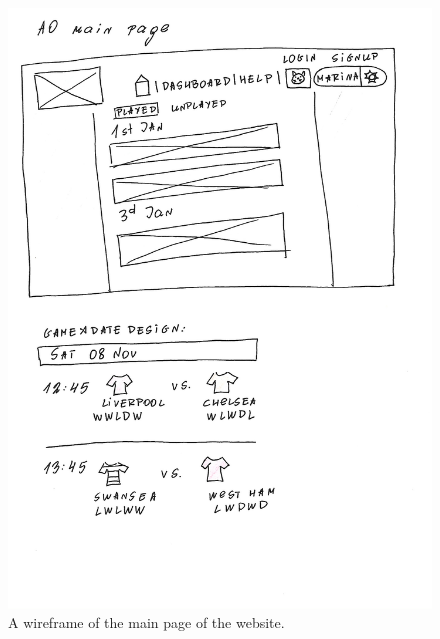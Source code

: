 \begin{figure}[H]
	\begin{center}
		\includegraphics[width=.90\textwidth]{design/images/A0.jpg}
		\caption{A wireframe of the main page of the website.} \label{fig:using:wireframe_a0}
	\end{center}
\end{figure}

